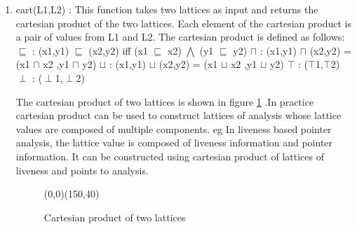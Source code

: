 \documentclass[12pt]{report}
\begin{document}
\begin{enumerate}
\item cart(L1,L2) : This function takes two lattices as input and returns the cartesian product of the two lattices. Each element of the cartesian product is a pair of values from L1 and L2. The cartesian product is defined as follows:
\newline
\newline
$\sqsubseteq$ : (x1,y1) $\sqsubseteq$ (x2,y2) iff (x1 $\sqsubseteq$ x2) $\bigwedge$ (y1 $\sqsubseteq$ y2)
\newline
$\sqcap$ : (x1,y1) $\sqcap$ (x2,y2) = (x1 $\sqcap$ x2 ,y1 $\sqcap$ y2)
\newline
$\sqcup$ : (x1,y1) $\sqcup$ (x2,y2) = (x1 $\sqcup$ x2 ,y1 $\sqcup$ y2)
\newline
$\top$ : ($\top$1,$\top$2) 
\newline
$\perp$ : ($\perp$1,$\perp$2)

The cartesian product of two lattices is shown in figure \ref{cartesianproduct} .In practice cartesian product can be used to construct lattices of analysis whose lattice values are composed of multiple components. eg In liveness based pointer analysis, the lattice value is composed of liveness information and pointer information. It can be constructed using cartesian product of lattices of liveness and points to analysis.

\begin{figure}[!htb]
			\begin{pspicture}(0,0)(150,40)
			\end{pspicture}
			\caption{Cartesian product of two lattices}
			\label{cartesianproduct}
			\end{figure}

\end{enumerate}
\end{document}
